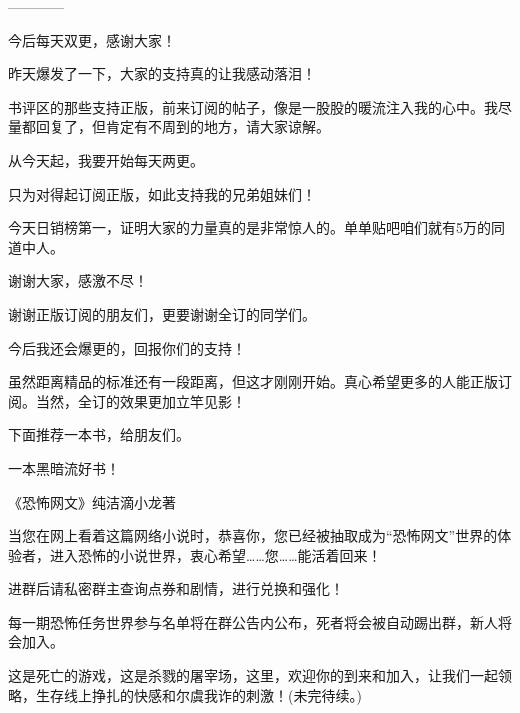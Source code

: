 \begin{this_body}
------------

今后每天双更，感谢大家！

昨天爆发了一下，大家的支持真的让我感动落泪！

书评区的那些支持正版，前来订阅的帖子，像是一股股的暖流注入我的心中。我尽量都回复了，但肯定有不周到的地方，请大家谅解。

从今天起，我要开始每天两更。

只为对得起订阅正版，如此支持我的兄弟姐妹们！

今天日销榜第一，证明大家的力量真的是非常惊人的。单单贴吧咱们就有5万的同道中人。

谢谢大家，感激不尽！

谢谢正版订阅的朋友们，更要谢谢全订的同学们。

今后我还会爆更的，回报你们的支持！

虽然距离精品的标准还有一段距离，但这才刚刚开始。真心希望更多的人能正版订阅。当然，全订的效果更加立竿见影！

下面推荐一本书，给朋友们。

一本黑暗流好书！

《恐怖网文》纯洁滴小龙著

当您在网上看着这篇网络小说时，恭喜你，您已经被抽取成为“恐怖网文”世界的体验者，进入恐怖的小说世界，衷心希望……您……能活着回来！

进群后请私密群主查询点券和剧情，进行兑换和强化！

每一期恐怖任务世界参与名单将在群公告内公布，死者将会被自动踢出群，新人将会加入。

这是死亡的游戏，这是杀戮的屠宰场，这里，欢迎你的到来和加入，让我们一起领略，生存线上挣扎的快感和尔虞我诈的刺激！(未完待续。)

\end{this_body}

